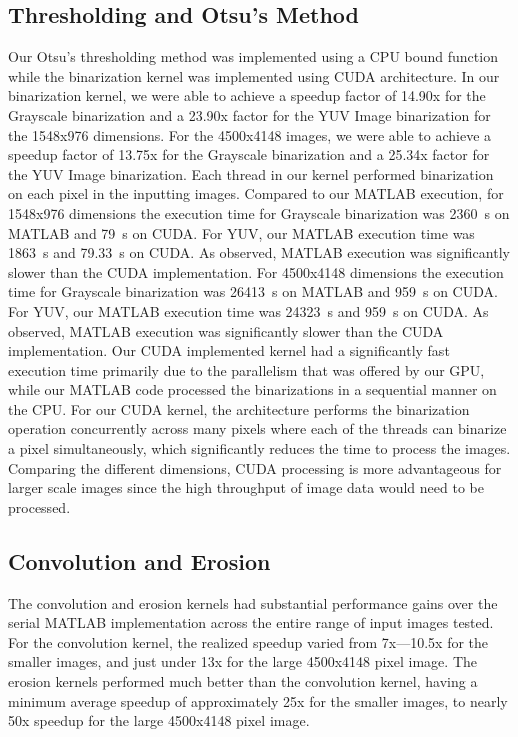 \documentclass[conference]{IEEEtran}
\newcommand{\micro}{~\textmu}
\begin{document}
      \subsection{Thresholding and Otsu’s Method}
         Our Otsu’s thresholding method was implemented using a CPU bound function while the binarization kernel was implemented using CUDA architecture. In our binarization kernel, we were able to achieve a speedup factor of 14.90x for the Grayscale binarization and a 23.90x factor for the YUV Image binarization for the 1548x976 dimensions. For the 4500x4148 images, we were able to achieve a speedup factor of 13.75x for the Grayscale binarization and a 25.34x factor for the YUV Image binarization.  Each thread in our kernel performed binarization on each pixel in the inputting images. Compared to our MATLAB execution, for 1548x976 dimensions the execution time for Grayscale binarization was 2360\micro s on MATLAB and 79\micro s on CUDA. For YUV, our MATLAB execution time was 1863\micro s and 79.33\micro s on CUDA. As observed, MATLAB execution was significantly slower than the CUDA implementation.  For 4500x4148 dimensions the execution time for Grayscale binarization was 26413\micro s on MATLAB and 959\micro s on CUDA. For YUV, our MATLAB execution time was 24323\micro s and 959\micro s on CUDA. As observed, MATLAB execution was significantly slower than the CUDA implementation. Our CUDA implemented kernel had a significantly fast execution time primarily due to the parallelism that was offered by our GPU, while our MATLAB code processed the binarizations in a sequential manner on the CPU. For our CUDA kernel, the architecture performs the binarization operation concurrently across many pixels where each of the threads can binarize a pixel simultaneously, which significantly reduces the time to process the images. Comparing the different dimensions, CUDA processing is more advantageous for larger scale images since the high throughput of image data would need to be processed.
      \subsection{Convolution and Erosion}
         The convolution and erosion kernels had substantial performance gains over the serial MATLAB implementation across the entire range of input images tested. For the convolution kernel, the realized speedup varied from 7x—10.5x for the smaller images, and just under 13x for the large 4500x4148 pixel image. The erosion kernels performed much better than the convolution kernel, having a minimum average speedup of approximately 25x for the smaller images, to nearly 50x speedup for the large 4500x4148 pixel image.
\end{document}
